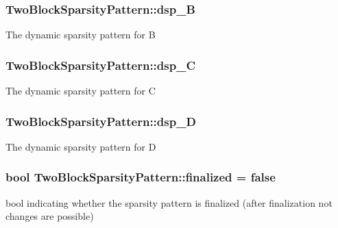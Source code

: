 \subsubsection[{\texorpdfstring{dsp\+\_\+B}{dsp_B}}]{ Two\+Block\+Sparsity\+Pattern\+::dsp\+\_\+B\hspace{0.3cm}{\ttfamily [private]}}\hypertarget{class_two_block_sparsity_pattern_ab1b2d6dc5d92f6353b80dd7a8d32ffa4}{}\label{class_two_block_sparsity_pattern_ab1b2d6dc5d92f6353b80dd7a8d32ffa4}
The dynamic sparsity pattern for B 
\subsubsection[{\texorpdfstring{dsp\+\_\+C}{dsp_C}}]{ Two\+Block\+Sparsity\+Pattern\+::dsp\+\_\+C\hspace{0.3cm}{\ttfamily [private]}}\hypertarget{class_two_block_sparsity_pattern_a444a6465b3ba1355fb675128c6e9800a}{}\label{class_two_block_sparsity_pattern_a444a6465b3ba1355fb675128c6e9800a}
The dynamic sparsity pattern for C 
\subsubsection[{\texorpdfstring{dsp\+\_\+D}{dsp_D}}]{ Two\+Block\+Sparsity\+Pattern\+::dsp\+\_\+D\hspace{0.3cm}{\ttfamily [private]}}\hypertarget{class_two_block_sparsity_pattern_a853d4000754f009a66853954d8c540bf}{}\label{class_two_block_sparsity_pattern_a853d4000754f009a66853954d8c540bf}
The dynamic sparsity pattern for D 
\subsubsection[{\texorpdfstring{finalized}{finalized}}]{\setlength{\rightskip}{0pt plus 5cm}bool Two\+Block\+Sparsity\+Pattern\+::finalized = false\hspace{0.3cm}{\ttfamily [private]}}\hypertarget{class_two_block_sparsity_pattern_a7c930cd0dd5e1d6fb1550d6c3939c7aa}{}\label{class_two_block_sparsity_pattern_a7c930cd0dd5e1d6fb1550d6c3939c7aa}
bool indicating whether the sparsity pattern is finalized (after finalization not changes are possible) 
